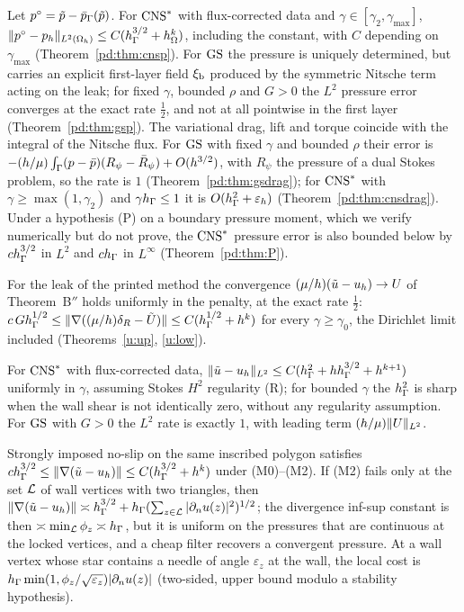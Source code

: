 \begin{theoremP}
Let $p^\circ=\tilde p-\bar p_{\Gamma}(\tilde p)$. For $\mathrm{CNS}^\ast$ with flux-corrected data and $\gamma\in[\gamma_2,\gamma_{\max}]$, $\lVert p^\circ-p_h\rVert_{L^2(\Omega_h)}\le C(h_\Gamma^{3/2}+h_\Omega^k)$, including the constant, with $C$ depending on $\gamma_{\max}$ (Theorem~\ref{pd:thm:cnsp}). For $\mathrm{GS}$ the pressure is uniquely determined, but carries an explicit first-layer field $\xi_{\mathrm b}$ produced by the symmetric Nitsche term acting on the leak; for fixed $\gamma$, bounded $\rho$ and $G>0$ the $L^2$ pressure error converges at the exact rate $\frac12$, and not at all pointwise in the first layer (Theorem~\ref{pd:thm:gsp}). The variational drag, lift and torque coincide with the integral of the Nitsche flux. For $\mathrm{GS}$ with fixed $\gamma$ and bounded $\rho$ their error is $-(h/\mu)\int_\Gamma(p-\bar p)(R_\psi-\bar R_\psi)+O(h^{3/2})$, with $R_\psi$ the pressure of a dual Stokes problem, so the rate is $1$ (Theorem~\ref{pd:thm:gsdrag}); for $\mathrm{CNS}^\ast$ with $\gamma\ge\max(1,\gamma_2)$ and $\gamma h_\Gamma\le1$ it is $O(h_\Gamma^2+\varepsilon_h)$ (Theorem~\ref{pd:thm:cnsdrag}). Under a hypothesis (P) on a boundary pressure moment, which we verify numerically but do not prove, the $\mathrm{CNS}^\ast$ pressure error is also bounded below by $ch_\Gamma^{3/2}$ in $L^2$ and $ch_\Gamma$ in $L^\infty$ (Theorem~\ref{pd:thm:P}).
\end{theoremP}

\begin{theoremU}
For the leak of the printed method the convergence $(\mu/h)(\tilde u-u_h)\to U$ of Theorem~B$''$ holds uniformly in the penalty, at the exact rate $\frac12$: $c\,Gh_\Gamma^{1/2}\le\lVert \nabla((\mu/h)\delta_R-\tilde U)\rVert\le C(h_\Gamma^{1/2}+h^k)$ for every $\gamma\ge\gamma_0$, the Dirichlet limit included (Theorems~\ref{u:up}, \ref{u:low}).
\end{theoremU}

\begin{theoremL}
For $\mathrm{CNS}^\ast$ with flux-corrected data, $\lVert \tilde u-u_h\rVert_{L^2}\le C(h_\Gamma^2+hh_\Gamma^{3/2}+h^{k+1})$ uniformly in $\gamma$, assuming Stokes $H^2$ regularity (R); for bounded $\gamma$ the $h_\Gamma^2$ is sharp when the wall shear is not identically zero, without any regularity assumption. For $\mathrm{GS}$ with $G>0$ the $L^2$ rate is exactly $1$, with leading term $(h/\mu)\lVert U\rVert_{L^2}$.
\end{theoremL}

\begin{theoremS}
Strongly imposed no-slip on the same inscribed polygon satisfies $ch_\Gamma^{3/2}\le\lVert \nabla(\tilde u-u_h)\rVert\le C(h_\Gamma^{3/2}+h^k)$ under (M0)--(M2). If (M2) fails only at the set $\mathcal L$ of wall vertices with two triangles, then $\lVert \nabla(\tilde u-u_h)\rVert\asymp h_\Gamma^{3/2}+h_\Gamma(\sum_{z\in\mathcal L}|\partial_n u(z)|^2)^{1/2}$; the divergence inf-sup constant is then $\asymp\min_{\mathcal L}\phi_z\asymp h_\Gamma$, but it is uniform on the pressures that are continuous at the locked vertices, and a cheap filter recovers a convergent pressure. At a wall vertex whose star contains a needle of angle $\varepsilon_z$ at the wall, the local cost is $h_\Gamma\min(1,\phi_z/\sqrt{\varepsilon_z})|\partial_n u(z)|$ (two-sided, upper bound modulo a stability hypothesis).
\end{theoremS}

